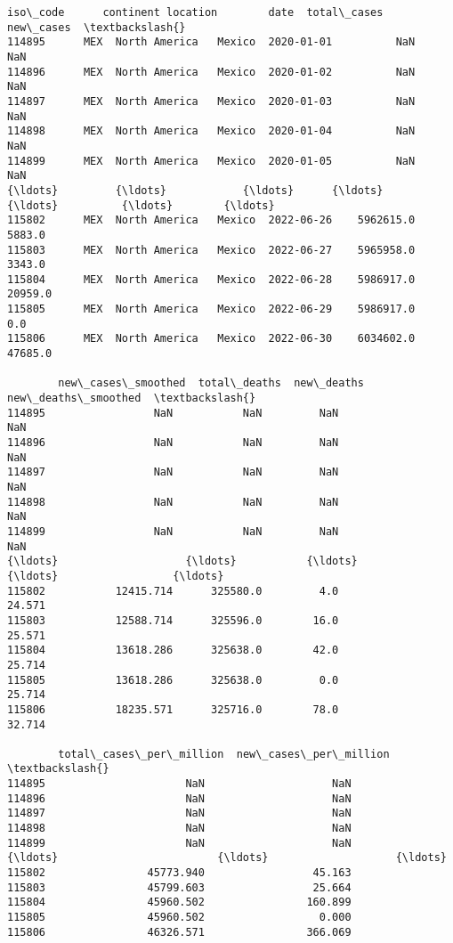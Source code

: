 \documentclass[11pt]{article}
\makeatletter
\newcommand{\boxspacing}{\kern\kvtcb@left@rule\kern\kvtcb@boxsep}
\newcommand{\prompt}[4]{
        {\ttfamily\llap{{\color{#2}[#3]:\hspace{3pt}#4}}\vspace{-\baselineskip}}
    }
\makeatother
\begin{document}
            \begin{tcolorbox}[breakable, size=fbox, boxrule=.5pt, pad at break*=1mm, opacityfill=0]
\prompt{Out}{outcolor}{24}{\boxspacing}
\begin{Verbatim}[commandchars=\\\{\}]
       iso\_code      continent location        date  total\_cases  new\_cases  \textbackslash{}
114895      MEX  North America   Mexico  2020-01-01          NaN        NaN
114896      MEX  North America   Mexico  2020-01-02          NaN        NaN
114897      MEX  North America   Mexico  2020-01-03          NaN        NaN
114898      MEX  North America   Mexico  2020-01-04          NaN        NaN
114899      MEX  North America   Mexico  2020-01-05          NaN        NaN
{\ldots}         {\ldots}            {\ldots}      {\ldots}         {\ldots}          {\ldots}        {\ldots}
115802      MEX  North America   Mexico  2022-06-26    5962615.0     5883.0
115803      MEX  North America   Mexico  2022-06-27    5965958.0     3343.0
115804      MEX  North America   Mexico  2022-06-28    5986917.0    20959.0
115805      MEX  North America   Mexico  2022-06-29    5986917.0        0.0
115806      MEX  North America   Mexico  2022-06-30    6034602.0    47685.0

        new\_cases\_smoothed  total\_deaths  new\_deaths  new\_deaths\_smoothed  \textbackslash{}
114895                 NaN           NaN         NaN                  NaN
114896                 NaN           NaN         NaN                  NaN
114897                 NaN           NaN         NaN                  NaN
114898                 NaN           NaN         NaN                  NaN
114899                 NaN           NaN         NaN                  NaN
{\ldots}                    {\ldots}           {\ldots}         {\ldots}                  {\ldots}
115802           12415.714      325580.0         4.0               24.571
115803           12588.714      325596.0        16.0               25.571
115804           13618.286      325638.0        42.0               25.714
115805           13618.286      325638.0         0.0               25.714
115806           18235.571      325716.0        78.0               32.714

        total\_cases\_per\_million  new\_cases\_per\_million  \textbackslash{}
114895                      NaN                    NaN
114896                      NaN                    NaN
114897                      NaN                    NaN
114898                      NaN                    NaN
114899                      NaN                    NaN
{\ldots}                         {\ldots}                    {\ldots}
115802                45773.940                 45.163
115803                45799.603                 25.664
115804                45960.502                160.899
115805                45960.502                  0.000
115806                46326.571                366.069


\end{Verbatim}
\end{tcolorbox}
\end{document}
